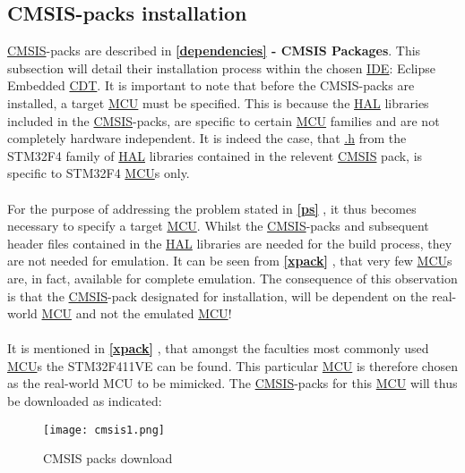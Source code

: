 \subsection{CMSIS-packs installation}
\label{CMSISpacks}
\hyperref[listAbr]{CMSIS}-packs are described in \textbf{\ref{dependencies}  - CMSIS Packages}. This subsection will detail their installation process within the chosen \hyperref[listAbr]{IDE}: Eclipse Embedded \hyperref[listAbr]{CDT}. It is important to note that before the CMSIS-packs are installed, a target \hyperref[listAbr]{MCU} must be specified. This is because the \hyperref[listAbr]{HAL} libraries included in the \hyperref[listAbr]{CMSIS}-packs, are specific to certain \hyperref[listAbr]{MCU} families and are not completely hardware independent. It is indeed the case, that \hyperref[listExt]{.h} from the STM32F4 family of \hyperref[listAbr]{HAL} libraries contained in the relevent \hyperref[listAbr]{CMSIS} pack, is specific to STM32F4 \hyperref[listAbr]{MCU}s only. 
\\\\
For the purpose of addressing the problem stated in \textbf{\ref{ps} }, it thus becomes necessary to specify a target \hyperref[listAbr]{MCU}. Whilst the \hyperref[listAbr]{CMSIS}-packs and subsequent header files contained in the \hyperref[listAbr]{HAL} libraries are needed for the build process, they are not needed for emulation. It can be seen from \textbf{\ref{xpack} }, that very few \hyperref[listAbr]{MCU}s are, in fact, available for complete emulation. The consequence of this observation is that the \hyperref[listAbr]{CMSIS}-pack designated for installation, will be dependent on the real-world \hyperref[listAbr]{MCU} and not the emulated \hyperref[listAbr]{MCU}!
\\\\
It is mentioned in \textbf{\ref{xpack} }, that amongst the faculties most commonly used \hyperref[listAbr]{MCU}s the STM32F411VE can be found. This particular \hyperref[listAbr]{MCU} is therefore chosen as the real-world MCU to be mimicked. The \hyperref[listAbr]{CMSIS}-packs for this \hyperref[listAbr]{MCU} will thus be downloaded as indicated:

\begin{figure}[H]
\begin{center}
\texttt{[image: cmsis1.png]}
\caption{CMSIS packs download}
\label{CMSIS1}
\end{center}
\end{figure}

